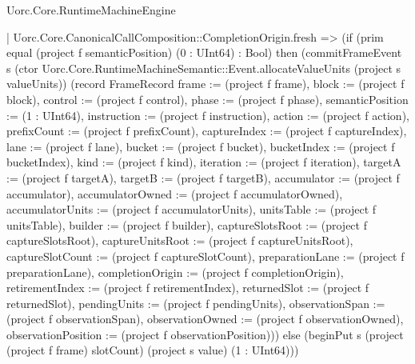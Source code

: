 \begin{lexlean}{Uorc.Core.RuntimeMachineEngine}
\begin{semanticmodule}
{          | Uorc.Core.CanonicalCallComposition::CompletionOrigin.fresh => (if (prim equal (project f semanticPosition) (0 : UInt64) : Bool) then (commitFrameEvent s (ctor Uorc.Core.RuntimeMachineSemantic::Event.allocateValueUnits (project s valueUnits)) (record FrameRecord {frame := (project f frame), block := (project f block), control := (project f control), phase := (project f phase), semanticPosition := (1 : UInt64), instruction := (project f instruction), action := (project f action), prefixCount := (project f prefixCount), captureIndex := (project f captureIndex), lane := (project f lane), bucket := (project f bucket), bucketIndex := (project f bucketIndex), kind := (project f kind), iteration := (project f iteration), targetA := (project f targetA), targetB := (project f targetB), accumulator := (project f accumulator), accumulatorOwned := (project f accumulatorOwned), accumulatorUnits := (project f accumulatorUnits), unitsTable := (project f unitsTable), builder := (project f builder), captureSlotsRoot := (project f captureSlotsRoot), captureUnitsRoot := (project f captureUnitsRoot), captureSlotCount := (project f captureSlotCount), preparationLane := (project f preparationLane), completionOrigin := (project f completionOrigin), retirementIndex := (project f retirementIndex), returnedSlot := (project f returnedSlot), pendingUnits := (project f pendingUnits), observationSpan := (project f observationSpan), observationOwned := (project f observationOwned), observationPosition := (project f observationPosition)})) else (beginPut s (project (project f frame) slotCount) (project s value) (1 : UInt64)))
}
\end{semanticmodule}
\end{lexlean}
